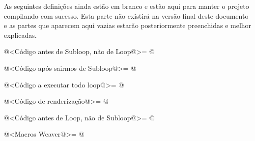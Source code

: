 As seguintes definições ainda estão em branco e estão aqui para manter
o projeto compilando com sucesso. Esta parte não existirá na versão
final deste documento e as partes que aparecem aqui vazias estarão
posteriormente preenchidas e melhor explicadas.

\iniciocodigo
@<Código antes de Subloop, não de Loop@>=
@
\fimcodigo

\iniciocodigo
@<Código após sairmos de Subloop@>=
@
\fimcodigo

\iniciocodigo
@<Código a executar todo loop@>=
@
\fimcodigo

\iniciocodigo
@<Código de renderização@>=
@
\fimcodigo

\iniciocodigo
@<Código antes de Loop, não de Subloop@>=
@
\fimcodigo

\iniciocodigo
@<Macros Weaver@>=
@
\fimcodigo





\fim
